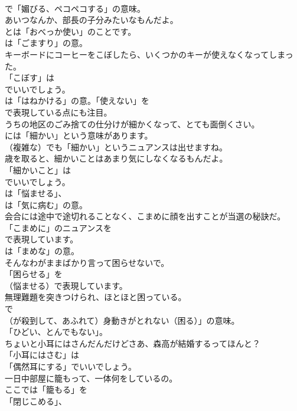 \documentclass[8pt]{extreport}
\begin{document}
\begin{CJK}{UTF8}{min}
\\	で「媚びる、ペコペコする」の意味。	
\\	あいつなんか、部長の子分みたいなもんだよ。 
\\	とは「おべっか使い」のことです。
\\	は「ごますり」の意。	
\\	キーボードにコーヒーをこぼしたら、いくつかのキーが使えなくなってしまった。 
\\	「こぼす」は
\\	でいいでしょう。
\\	は「はねかける」の意。「使えない」を
\\	で表現している点にも注目。	
\\	うちの地区のごみ捨ての仕分けが細かくなって、とても面倒くさい。 
\\	には「細かい」という意味があります。
\\	（複雑な）でも「細かい」というニュアンスは出せますね。	
\\	歳を取ると、細かいことはあまり気にしなくなるもんだよ。 
\\	「細かいこと」は
\\	でいいでしょう。
\\	は「悩ませる」、
\\	は「気に病む」の意。	
\\	会合には途中で途切れることなく、こまめに顔を出すことが当選の秘訣だ。 
\\	「こまめに」のニュアンスを 
\\	で表現しています。
\\	は「まめな」の意。	
\\	そんなわがままばかり言って困らせないで。 
\\	「困らせる」を 
\\	（悩ませる）で表現しています。	
\\	無理難題を突きつけられ、ほとほと困っている。 
\\	で
\\	（が殺到して、あふれて）身動きがとれない（困る）」の意味。
\\	「ひどい、とんでもない」。	
\\	ちょいと小耳にはさんだんだけどさあ、森高が結婚するってほんと？ 
\\	「小耳にはさむ」は
\\	「偶然耳にする」でいいでしょう。	
\\	一日中部屋に籠もって、一体何をしているの。 
\\	ここでは「籠もる」を
\\	「閉じこめる」、

\end{CJK}
\end{document}
